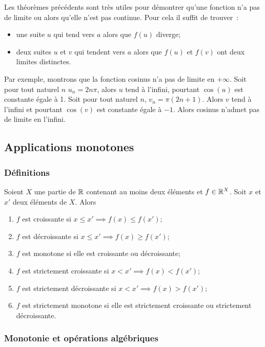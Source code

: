 Les théorèmes précédents sont très utiles pour démontrer qu'une fonction n'a pas de limite ou alors qu'elle n'est pas continue. Pour cela il suffit de trouver~:
\begin{itemize}
\item une suite $u$ qui tend vers $a$ alors que $f(u)$ diverge;
\item deux suites $u$ et $v$ qui tendent vers $a$ alors que $f(u)$ et $f(v)$ ont deux limites distinctes.
\end{itemize}

Par exemple, montrons que la fonction cosinus n'a pas de limite en $+\infty$. Soit pour tout naturel $n$ $u_n=2n\pi$, alors $u$ tend à l'infini, pourtant $\cos(u)$ est constante égale à 1. Soit pour tout naturel $n$, $v_n=\pi(2n+1)$. Alors $v$ tend à l'infini et pourtant $\cos(v)$ est constante égale à $-1$. Alors cosinus n'admet pas de limite en l'infini.

\subsection{Applications monotones}

\subsubsection{Définitions}

Soient $X$ une partie de $\mathbb{R}$ contenant au moins deux éléments et $f \in \mathbb{R}^X$. Soit $x$ et $x'$ deux éléments de $X$. Alors
\begin{enumerate}
\item $f$ est croissante si $x \leq x' \implies f(x) \leq f(x')$;
\item $f$ est décroissante si $x \leq x' \implies f(x) \geq f(x')$;
\item $f$ est monotone si elle est croissante ou décroissante;
\item $f$ est strictement croissante si $x < x' \implies f(x) < f(x')$;
\item $f$ est strictement décroissante si $x < x' \implies f(x) > f(x')$;
\item $f$ est strictement monotone si elle est strictement croissante ou strictement décroissante.
\end{enumerate}

\subsubsection{Monotonie et opérations algébriques}


